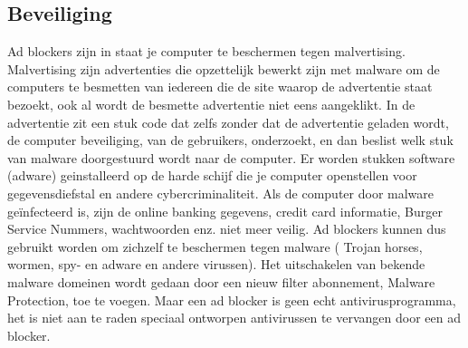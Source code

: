 \documentclass[pdftex,a4paper,12pt,twoside]{report}
\begin{document}
\subsection{Beveiliging}
\label{sec Beveiliging}
Ad blockers zijn in staat je computer te beschermen tegen malvertising. Malvertising zijn advertenties die opzettelijk bewerkt zijn met malware om de computers te besmetten van iedereen die de site waarop de advertentie staat bezoekt, ook al wordt de besmette advertentie niet eens aangeklikt. 
In de advertentie zit een stuk code dat zelfs zonder dat de advertentie geladen wordt, de computer beveiliging, van de gebruikers, onderzoekt, en dan beslist welk stuk van malware doorgestuurd wordt naar de computer. Er worden stukken software (adware) geinstalleerd op de harde schijf die je computer openstellen voor gegevensdiefstal en andere cybercriminaliteit. Als de computer door malware geïnfecteerd is, zijn de online banking gegevens, credit card informatie, Burger Service Nummers, wachtwoorden enz. niet meer veilig. 
Ad blockers kunnen dus gebruikt worden om zichzelf te beschermen tegen malware ( Trojan horses, wormen, spy- en adware en andere virussen). Het uitschakelen van bekende malware domeinen wordt gedaan door een nieuw filter abonnement, Malware Protection, toe te voegen. Maar een ad blocker is geen echt antivirusprogramma, het is niet aan te raden speciaal ontworpen antivirussen te vervangen door een ad blocker. 
\end{document}
